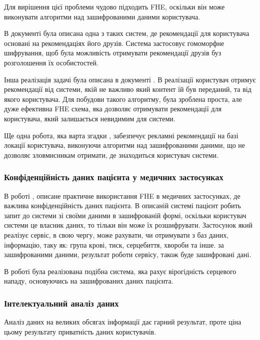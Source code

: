 Для вирішення цієї проблеми чудово підходить FHE, оскільки він може виконувати алгоритми над
зашифрованими даними користувача.

В документі \cite{arjan2005} була описана одна з таких систем, де рекомендації для користувача
основані на рекомендаціях його друзів. Система застосовує гомоморфне шифрування, щоб була
можливість отримувати рекомендації друзів буз розголошення їх особистостей.

Інша реалізація задачі була описана в документі \cite{armfredthor2011}. В реалізації
користувач отримує рекомендації від системи, якій не важливо який контент їй був переданий, та
від якого користувача. Для побудови такого алгоритму, була зроблена проста, але дуже ефективна
FHE схема, яка дозволяє отримувати рекомендації для користувача, який залишається невидимим для
системи.

Ще одна робота, яка варта згадки \cite{10.1145/2046660.2046682}, забезпечує рекламні
рекомендації на базі локації користувача, виконуючи алгоритми над зашифрованими даними, що
не дозволяє зловмисникам отримати, де знаходиться користувач системи.

\subsubsection*{Конфіденційність даних пацієнта у медичних застосунках}

В роботі \cite{10.1145/2046660.2046682}, описане практичне використання FHE в медичних
застосунках, де важлива конфіденційність даних пацієнта. В описаній системі пацієнт робить
запит до системи зі своїми даними в зашифрованій формі, оскільки користувач системи це
власник даних, то тільки він може їх розшифрувати. Застосунок який реалізує сервіс, в свою
чергу, може рахувати, чи отримувати з баз даних, інформацію, таку як: група крові, тиск, 
серцебиття, хвороби та інше. за зашифрованими даними, результат роботи сервісу, також буде
зашифровані дані.

В роботі \cite{cryptoeprint:2011/405} була реалізована подібна система, яка рахує вірогідність
серцевого нападу, основуючись на зашифрованих даних пацієнта.

\subsubsection*{Інтелектуальний аналіз даних}
Аналіз даних на великих обсягах інформації дає гарний результат, проте ціна цьому результату
приватність даних користувачів.


